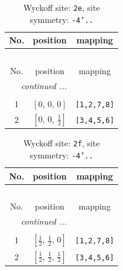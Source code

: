 \documentclass[fleqn,8pt]{jsarticle}
\begin{document}
\begin{longtable}{ccc}
\caption{Wyckoff site: {\tt 2e}, site symmetry: {\tt -4'..}}
 \\
 \hline \hline
No. & position & mapping \\ \hline \endfirsthead

\multicolumn{2}{l}{\tablename\ \thetable{}} \\
 \hline \hline
No. & position & mapping \\ \hline \endhead

 \hline \hline
\multicolumn{2}{r}{\footnotesize\it continued ...} \\ \endfoot

 \hline \hline
\multicolumn{2}{r}{} \\ \endlastfoot

1 & $\left[ 0,\, 0,\, 0 \right]$ & {\tt [1,2,7,8]} \\ \hline
2 & $\left[ 0,\, 0,\, \frac{1}{2} \right]$ & {\tt [3,4,5,6]} \\
\end{longtable}
\renewcommand{\arraystretch}{1.2}
\begin{longtable}{ccc}
\caption{Wyckoff site: {\tt 2f}, site symmetry: {\tt -4'..}}
 \\
 \hline \hline
No. & position & mapping \\ \hline \endfirsthead

\multicolumn{2}{l}{\tablename\ \thetable{}} \\
 \hline \hline
No. & position & mapping \\ \hline \endhead

 \hline \hline
\multicolumn{2}{r}{\footnotesize\it continued ...} \\ \endfoot

 \hline \hline
\multicolumn{2}{r}{} \\ \endlastfoot

1 & $\left[ \frac{1}{2},\, \frac{1}{2},\, 0 \right]$ & {\tt [1,2,7,8]} \\ \hline
2 & $\left[ \frac{1}{2},\, \frac{1}{2},\, \frac{1}{2} \right]$ & {\tt [3,4,5,6]} \\
\end{longtable}
\renewcommand{\arraystretch}{1.2}
\end{document}
